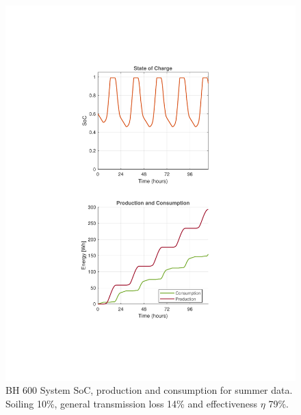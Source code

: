 \hspace{0.02\textwidth}%
\begin{minipage}[t]{0.32\textwidth} %
    \begin{figure}[H]
        \centering
        \includegraphics[width=\linewidth]{photos/Summer_SOC&Consumption_with_all_loss_5Days_600System.pdf} %
        \captionsetup{font=footnotesize} %
        \caption{BH 600 System SoC, production and consumption for summer data. Soiling 10\%, general transmission loss 14\% and effectiveness $\eta$ 79\%.}
        \label{result:fig:600_summer_soc}
    \end{figure}
\end{minipage}
\hspace{0.02\textwidth}%
